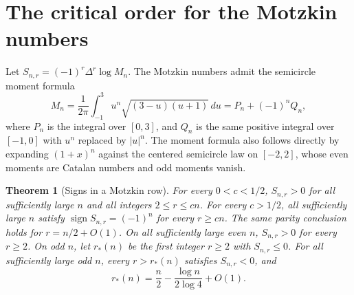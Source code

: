 \documentclass[11pt,a4paper]{article}
\newtheorem{theorem}{Theorem}[section]
\begin{document}
\section{The critical order for the Motzkin numbers}\label{sec:motzkin}
Let $S_{n,r}=(-1)^r\Delta^r\log M_n$. The Motzkin numbers admit the semicircle moment formula
\[
 M_n=\frac1{2\pi}\int_{-1}^3 u^n\sqrt{(3-u)(u+1)}\,du
    =P_n+(-1)^nQ_n,
\]
where $P_n$ is the integral over $[0,3]$, and $Q_n$ is the same positive integral over $[-1,0]$ with $u^n$ replaced by $|u|^n$. The moment formula also follows directly by expanding $(1+x)^n$ against the centered semicircle law on $[-2,2]$, whose even moments are Catalan numbers and odd moments vanish.

\begin{theorem}[Signs in a Motzkin row]\label{thm:transition}
For every $0<c<1/2$, $S_{n,r}>0$ for all sufficiently large $n$ and all integers $2\le r\le cn$. For every $c>1/2$, all sufficiently large $n$ satisfy $\operatorname{sign}S_{n,r}=(-1)^n$ for every $r\ge cn$. The same parity conclusion holds for $r=n/2+O(1)$. On all sufficiently large even $n$, $S_{n,r}>0$ for every $r\ge2$. On odd $n$, let $r_*(n)$ be the first integer $r\ge2$ with $S_{n,r}\le0$. For all sufficiently large odd $n$, every $r>r_*(n)$ satisfies $S_{n,r}<0$, and
\[
 r_*(n)=\frac n2-\frac{\log n}{2\log4}+O(1).
\]

\end{theorem}
\end{document}
